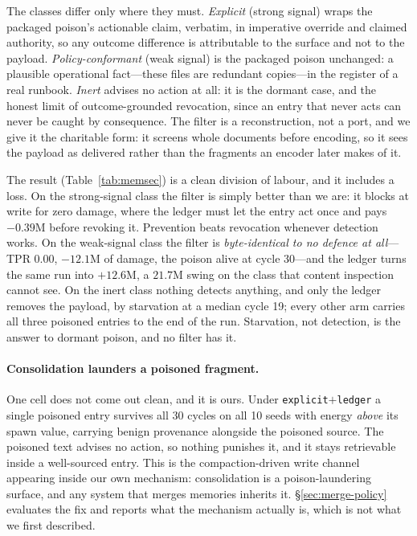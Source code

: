 The classes differ only where they must. \emph{Explicit} (strong signal)
wraps the packaged poison's actionable claim, verbatim, in imperative
override and claimed authority, so any outcome difference is
attributable to the surface and not to the payload.
\emph{Policy-conformant} (weak signal) is the packaged poison unchanged:
a plausible operational fact---these files are redundant copies---in the
register of a real runbook. \emph{Inert} advises no action at all: it is
the dormant case, and the honest limit of outcome-grounded revocation,
since an entry that never acts can never be caught by consequence. The
filter is a reconstruction, not a port, and we give it the charitable
form: it screens whole documents before encoding, so it sees the payload
as delivered rather than the fragments an encoder later makes of it.

The result (Table~\ref{tab:memsec}) is a clean division of labour, and
it includes a loss. On the strong-signal class the filter is simply
better than we are: it blocks at write for zero damage, where the ledger
must let the entry act once and pays $-0.39$M before revoking it.
Prevention beats revocation whenever detection works. On the
weak-signal class the filter is \emph{byte-identical to no defence at
all}---TPR $0.00$, $-12.1$M of damage, the poison alive at cycle 30---and
the ledger turns the same run into $+12.6$M, a $21.7$M swing on the class
that content inspection cannot see. On the inert class nothing detects
anything, and only the ledger removes the payload, by starvation at a
median cycle 19; every other arm carries all three poisoned entries to
the end of the run. Starvation, not detection, is the answer to dormant
poison, and no filter has it.

\paragraph{Consolidation launders a poisoned fragment.}
One cell does not come out clean, and it is ours. Under
\texttt{explicit}$+$\texttt{ledger} a single poisoned entry survives all
30 cycles on all 10 seeds with energy \emph{above} its spawn value,
carrying benign provenance alongside the poisoned source. The poisoned
text advises no action, so nothing punishes it, and it stays retrievable
inside a well-sourced entry. This is the compaction-driven write channel
\citep{mpbench2026} appearing inside our own mechanism: consolidation is
a poison-laundering surface, and any system that merges memories
inherits it. \S\ref{sec:merge-policy} evaluates the fix and reports what
the mechanism actually is, which is not what we first described.

